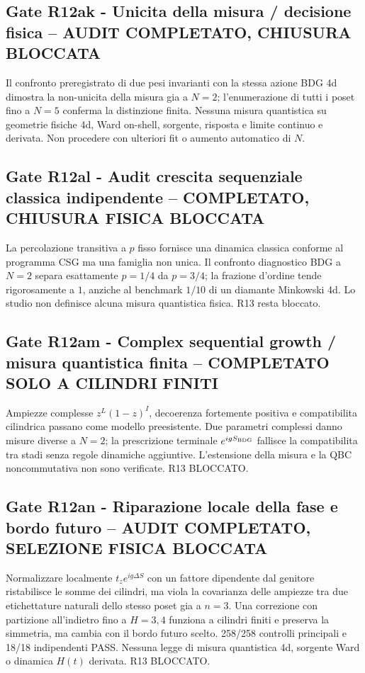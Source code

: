 \documentclass[11pt,a4paper]{article}
\begin{document}
\subsection*{Gate R12ak - Unicita della misura / decisione fisica -- AUDIT COMPLETATO, CHIUSURA BLOCCATA}
Il confronto preregistrato di due pesi invarianti con la stessa azione BDG 4d dimostra la non-unicita della misura gia a $N=2$; l'enumerazione di tutti i poset fino a $N=5$ conferma la distinzione finita. Nessuna misura quantistica su geometrie fisiche 4d, Ward on-shell, sorgente, risposta e limite continuo e derivata. Non procedere con ulteriori fit o aumento automatico di $N$.

\subsection*{Gate R12al - Audit crescita sequenziale classica indipendente -- COMPLETATO, CHIUSURA FISICA BLOCCATA}
La percolazione transitiva a $p$ fisso fornisce una dinamica classica conforme al programma CSG ma una famiglia non unica. Il confronto diagnostico BDG a $N=2$ separa esattamente $p=1/4$ da $p=3/4$; la frazione d'ordine tende rigorosamente a $1$, anziche al benchmark $1/10$ di un diamante Minkowski 4d. Lo studio non definisce alcuna misura quantistica fisica. R13 resta bloccato.

\subsection*{Gate R12am - Complex sequential growth / misura quantistica finita -- COMPLETATO SOLO A CILINDRI FINITI}
Ampiezze complesse $z^L(1-z)^I$, decoerenza fortemente positiva e compatibilita cilindrica passano come modello preesistente. Due parametri complessi danno misure diverse a $N=2$; la prescrizione terminale $e^{igS_{\rm BDG}}$ fallisce la compatibilita tra stadi senza regole dinamiche aggiuntive. L'estensione della misura e la QBC noncommutativa non sono verificate. R13 BLOCCATO.

\subsection*{Gate R12an - Riparazione locale della fase e bordo futuro -- AUDIT COMPLETATO, SELEZIONE FISICA BLOCCATA}
Normalizzare localmente $t_z e^{ig\Delta S}$ con un fattore dipendente dal genitore ristabilisce le somme dei cilindri, ma viola la covarianza delle ampiezze tra due etichettature naturali dello stesso poset gia a $n=3$. Una correzione con partizione all'indietro fino a $H=3,4$ funziona a cilindri finiti e preserva la simmetria, ma cambia con il bordo futuro scelto. 258/258 controlli principali e 18/18 indipendenti PASS. Nessuna legge di misura quantistica 4d, sorgente Ward o dinamica $H(t)$ derivata. R13 BLOCCATO.
\end{document}
